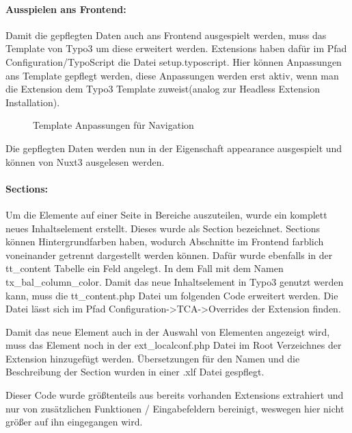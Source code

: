 \paragraph{Ausspielen ans Frontend:}

Damit die gepflegten Daten auch ans Frontend ausgespielt werden, muss das Template von Typo3 um diese erweitert werden. Extensions haben dafür im Pfad Configuration/TypoScript die Datei setup.typoscript. Hier können Anpassungen ans Template gepflegt werden, diese Anpassungen werden erst aktiv, wenn man die Extension dem Typo3 Template zuweist(analog zur Headless Extension Installation).

\begin{figure}[htb]
\centering
{}
\caption{Template Anpassungen für Navigation}
\label{fig:Template Anpassungen für Navigation}
\end{figure}

Die gepflegten Daten werden nun in der Eigenschaft appearance ausgespielt und können von Nuxt3 ausgelesen werden.

\paragraph{Sections:}
Um die Elemente auf einer Seite in Bereiche auszuteilen, wurde ein komplett neues Inhaltselement erstellt. Dieses wurde als Section bezeichnet. Sections können Hintergrundfarben haben, wodurch Abschnitte im Frontend farblich voneinander getrennt dargestellt werden können. Dafür wurde ebenfalls in der tt\_content Tabelle ein Feld angelegt. In dem Fall mit dem Namen tx\_bal\_column\_color. Damit das neue Inhaltselement in Typo3 genutzt werden kann, muss die tt\_content.php Datei um folgenden Code erweitert werden.  \newline Die Datei lässt sich im Pfad Configuration->TCA->Overrides der Extension finden.

Damit das neue Element auch in der Auswahl von Elementen angezeigt wird, muss das Element noch in der ext\_localconf.php Datei im Root Verzeichnes der Extension hinzugefügt werden.\newline {} \newline Übersetzungen für den Namen und die Beschreibung der Section wurden in einer .xlf Datei gespflegt.

Dieser Code wurde größtenteils aus bereits vorhanden Extensions extrahiert und nur von zusätzlichen Funktionen / Eingabefeldern bereinigt, weswegen hier nicht größer auf ihn eingegangen wird.

